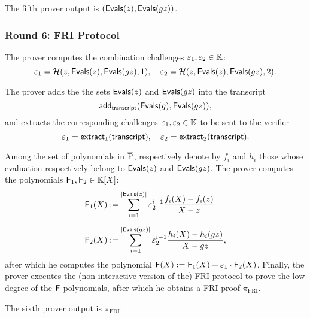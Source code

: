 The fifth prover output is $(\textsf{Evals}(z),\textsf{Evals}(gz))$.


\subsubsection*{Round 6: FRI Protocol}

\ifNOPOLYGON
The prover computes the combination challenges $\varepsilon_1,\varepsilon_2 \in \mathbb{K}$:
\[
  \varepsilon_1 = \mathcal{H}(z,\textsf{Evals}(z),\textsf{Evals}(gz),1), \quad \varepsilon_2 = \mathcal{H}(z,\textsf{Evals}(z),\textsf{Evals}(gz),2).
\]
\fi

\ifPOLYGON
The prover adds the the sets $\textsf{Evals}(z)$ and $\textsf{Evals}(gz)$ into the transcript
\[
\textsf{add}_{\textsf{transcript}}(\textsf{Evals}(g), \textsf{Evals}(gz)),
\]
and extracts the corresponding challenges $\varepsilon_1, \varepsilon_2 \in \mathbb{K}$ to be sent to the verifier
\[
\varepsilon_1 = \mathsf{extract}_{1}(\textsf{transcript}), \quad \varepsilon_2 = \mathsf{extract}_{2}(\textsf{transcript}).
\]
\fi

  
Among the set of polynomials in $\overline{\text{P}}$, respectively denote by $f_i$ and $h_i$ those whose evaluation respectively belong to $\textsf{Evals}(z)$ and $\textsf{Evals}(gz)$. The prover computes the polynomials $\textsf{F}_1,\textsf{F}_2 \in \mathbb{K}[X]$:
\begin{align*}
  \textsf{F}_1(X) &:= \sum_{i = 1}^{|\textsf{Evals}(z)|} \varepsilon_2^{i-1} \frac{f_i(X) - f_i(z)}{X-z} \\[0.2cm]
  \textsf{F}_2(X) &:= \sum_{i = 1}^{|\textsf{Evals}(gz)|} \varepsilon_2^{i-1} \frac{h_i(X) - h_i(gz)}{X-gz},
\end{align*}
after which he computes the polynomial $\textsf{F}(X) := \textsf{F}_1(X) + \varepsilon_1 \cdot \textsf{F}_2(X)$. Finally, the prover executes the (non-interactive version of the) FRI protocol to prove the low degree of the $\textsf{F}$ polynomials, after which he obtains a FRI proof $\pi_{\text{FRI}}$.

The sixth prover output is $\pi_{\text{FRI}}$.

